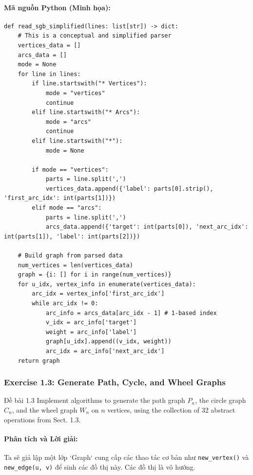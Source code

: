 \documentclass[a4paper,12pt]{article}
\begin{document}
\paragraph{Mã nguồn Python (Minh họa):}
\begin{lstlisting}[style=pythonstyle, caption={Logic đọc và ghi đồ thị SGB. (code minh họa)}]
def read_sgb_simplified(lines: list[str]) -> dict:
    # This is a conceptual and simplified parser
    vertices_data = []
    arcs_data = []
    mode = None
    for line in lines:
        if line.startswith("* Vertices"):
            mode = "vertices"
            continue
        elif line.startswith("* Arcs"):
            mode = "arcs"
            continue
        elif line.startswith("*"):
            mode = None

        if mode == "vertices":
            parts = line.split(',')
            vertices_data.append({'label': parts[0].strip(), 'first_arc_idx': int(parts[1])})
        elif mode == "arcs":
            parts = line.split(',')
            arcs_data.append({'target': int(parts[0]), 'next_arc_idx': int(parts[1]), 'label': int(parts[2])})
            
    # Build graph from parsed data
    num_vertices = len(vertices_data)
    graph = {i: [] for i in range(num_vertices)}
    for u_idx, vertex_info in enumerate(vertices_data):
        arc_idx = vertex_info['first_arc_idx']
        while arc_idx != 0:
            arc_info = arcs_data[arc_idx - 1] # 1-based index
            v_idx = arc_info['target']
            weight = arc_info['label']
            graph[u_idx].append((v_idx, weight))
            arc_idx = arc_info['next_arc_idx']
    return graph
\end{lstlisting}

\subsubsection{Exercise 1.3: Generate Path, Cycle, and Wheel Graphs}
\begin{problembox}{Đề bài 1.3}
    Implement algorithms to generate the path graph $P_n$, the circle graph $C_n$, and the wheel graph $W_n$ on $n$ vertices, using the collection of 32 abstract operations from Sect. 1.3.
\end{problembox}

\paragraph{Phân tích và Lời giải:}
Ta sẽ giả lập một lớp `Graph` cung cấp các thao tác cơ bản như \texttt{new\_vertex()} và \texttt{new\_edge(u, v)} để sinh các đồ thị này. Các đồ thị là vô hướng.
\end{document}
